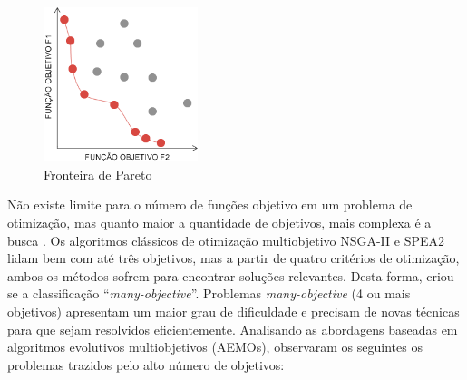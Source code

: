\begin{figure}
	\centering
	\includegraphics[width=0.4\textwidth]{cap_otimizacao-multi/figs/pareto}
	\caption{\label{fig_pareto}Fronteira de Pareto}
\end{figure}

Não existe limite para o número de funções objetivo em um problema de otimização, mas quanto maior a quantidade de objetivos, mais complexa é a busca \cite{Deb2014}. Os algoritmos clássicos de otimização multiobjetivo \ac{NSGA-II} e \ac{SPEA2} lidam bem com até três objetivos, mas a partir de quatro critérios de otimização, ambos os métodos sofrem para encontrar soluções relevantes. Desta forma, criou-se a classificação ``\textit{many-objective}''. Problemas \textit{many-objective} (4 ou mais objetivos) apresentam um maior grau de dificuldade e precisam de novas técnicas para que sejam resolvidos eficientemente. Analisando as abordagens baseadas em algoritmos evolutivos multiobjetivos (AEMOs), \cite{Deb2014} observaram os seguintes os problemas trazidos pelo alto número de objetivos:

